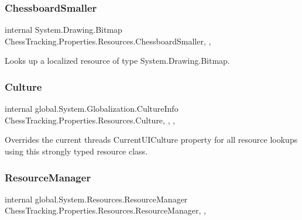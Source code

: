 \subsubsection{\texorpdfstring{ChessboardSmaller}{ChessboardSmaller}}
{\footnotesize\ttfamily internal System.\+Drawing.\+Bitmap Chess\+Tracking.\+Properties.\+Resources.\+Chessboard\+Smaller\hspace{0.3cm}{\ttfamily [static]}, {\ttfamily [get]}, {\ttfamily [private]}}



Looks up a localized resource of type System.\+Drawing.\+Bitmap. 

\mbox{\label{class_chess_tracking_1_1_properties_1_1_resources_a80e6d45221b54dbc81987827118306e5}} 
\subsubsection{\texorpdfstring{Culture}{Culture}}
{\footnotesize\ttfamily internal global.\+System.\+Globalization.\+Culture\+Info Chess\+Tracking.\+Properties.\+Resources.\+Culture\hspace{0.3cm}{\ttfamily [static]}, {\ttfamily [get]}, {\ttfamily [set]}, {\ttfamily [private]}}



Overrides the current thread\textquotesingle{}s Current\+U\+I\+Culture property for all resource lookups using this strongly typed resource class. 

\mbox{\label{class_chess_tracking_1_1_properties_1_1_resources_ab404fea48cfbfeaced8490e58fa953e8}} 
\subsubsection{\texorpdfstring{ResourceManager}{ResourceManager}}
{\footnotesize\ttfamily internal global.\+System.\+Resources.\+Resource\+Manager Chess\+Tracking.\+Properties.\+Resources.\+Resource\+Manager\hspace{0.3cm}{\ttfamily [static]}, {\ttfamily [get]}, {\ttfamily [private]}}



